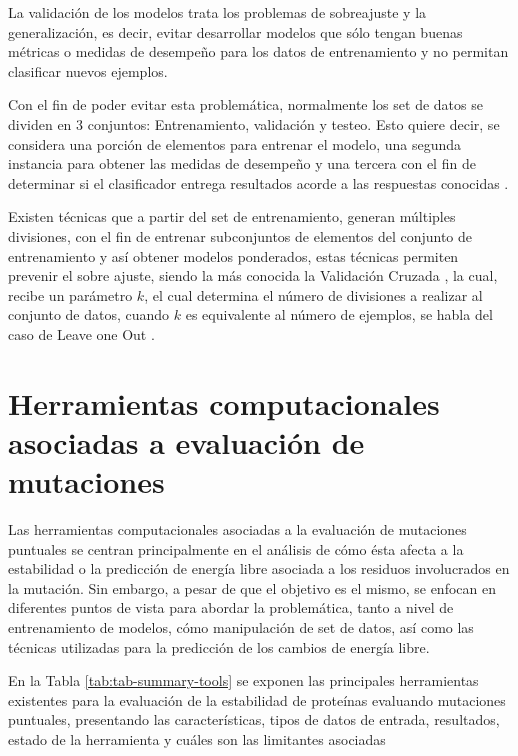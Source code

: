 La validación de los modelos trata los problemas de sobreajuste y la generalización, es decir, evitar desarrollar modelos que sólo tengan buenas métricas o medidas de desempeño para los datos de entrenamiento y no permitan clasificar nuevos ejemplos. 

Con el fin de poder evitar esta problemática, normalmente los set de datos se dividen en 3 conjuntos: Entrenamiento, validación y testeo. Esto quiere decir, se considera una porción de elementos para entrenar el modelo, una segunda instancia para obtener las medidas de desempeño y una tercera con el fin de determinar si el clasificador entrega resultados acorde a las respuestas conocidas \cite{kohavi1995study}.

Existen técnicas que a partir del set de entrenamiento, generan múltiples divisiones, con el fin de entrenar subconjuntos de elementos del conjunto de entrenamiento y así obtener modelos ponderados, estas técnicas permiten prevenir el sobre ajuste, siendo la más conocida la Validación Cruzada  \cite{golub1979generalized} , la cual, recibe un parámetro $k$, el cual determina el número de divisiones a realizar al conjunto de datos, cuando $k$ es equivalente al número de ejemplos, se habla del caso de Leave one Out \cite{vehtari2017practical}.


\section{Herramientas computacionales asociadas a evaluación de mutaciones}

Las herramientas computacionales asociadas a la evaluación de mutaciones puntuales se centran principalmente en el análisis de cómo ésta afecta a la estabilidad o la predicción de energía libre asociada a los residuos involucrados en la mutación. Sin embargo, a pesar de que el objetivo es el mismo, se enfocan en diferentes puntos de vista para abordar la problemática, tanto a nivel de entrenamiento de modelos, cómo manipulación de set de datos, así como las técnicas utilizadas para la predicción de los cambios de energía libre.

En la Tabla \ref{tab:tab-summary-tools} se exponen las principales herramientas existentes para la evaluación de la estabilidad de proteínas evaluando mutaciones puntuales, presentando las características, tipos de datos de entrada, resultados, estado de la herramienta y cuáles son las limitantes asociadas

